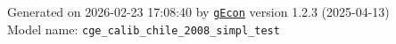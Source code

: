\documentclass[10pt,a4paper]{article}
\numberwithin{equation}{section}
\begin{document}
\begin{landscape}
\begin{flushleft}{\large
Generated  on 2026-02-23 17:08:40 by \href{http://gecon.r-forge.r-project.org/}{\texttt{gEcon}} version 1.2.3 (2025-04-13)\\
Model name: \verb+cge_calib_chile_2008_simpl_test+
}\end{flushleft}


\end{landscape}

\end{document}
